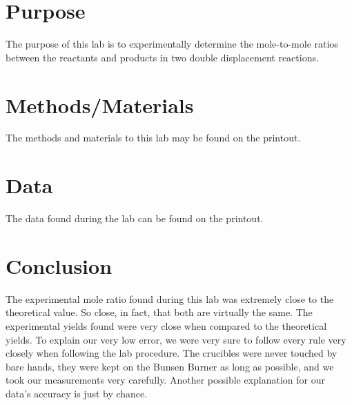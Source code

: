 \documentclass{article}
\begin{document}

\section{Purpose}

	The purpose of this lab is to experimentally determine the mole-to-mole ratios between the reactants and products in two double displacement reactions.

\section{Methods/Materials}

	The methods and materials to this lab may be found on the printout.

\section{Data}

	The data found during the lab can be found on the printout.

\section{Conclusion}

	The experimental mole ratio found during this lab was extremely close to the theoretical value. So close, in fact, that both are virtually the same. The experimental yields found were very close when compared to the theoretical yields. To explain our very low error, we were very sure to follow every rule very closely when following the lab procedure. The crucibles were never touched by bare hands, they were kept on the Bunsen Burner as long as possible, and we took our measurements very carefully. Another possible explanation for our data's accuracy is just by chance.
\end{document}
